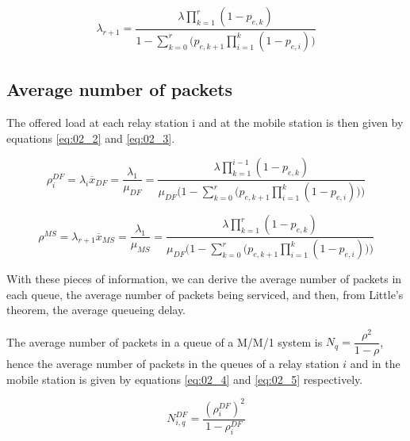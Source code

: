 \begin{align}
  \lambda_{r+1} = \dfrac{\lambda \prod\limits_{k=1}^{r} (1 - p_{e,k})}{1 - \sum\limits_{k=0}^r \Big(p_{e,k+1} \prod\limits_{i=1}^k (1 - p_{e,i})\Big)}
  \label{eq:02_lambda_r_plus_one}
\end{align}


\subsection{Average number of packets}

The offered load at each relay station i and at the mobile station is then given
by equations \ref{eq:02_2} and \ref{eq:02_3}.

\begin{equation}
  \rho_i^{DF} = \lambda_i \overline{x}_{DF} = \dfrac{\lambda_1}{\mu_{DF}} =
  \dfrac{\lambda \prod\limits_{k=1}^{i-1} (1 - p_{e,k})}{\mu_{DF}\Bigg(1 - \sum\limits_{k=0}^r \Big(p_{e,k+1} \prod\limits_{i=1}^k (1 - p_{e,i})\Big)\Bigg)}
  \label{eq:02_2}
\end{equation}

\begin{equation}
  \rho^{MS} = \lambda_{r+1} \overline{x}_{MS} = \dfrac{\lambda_1}{\mu_{MS}} =
  \dfrac{\lambda \prod\limits_{k=1}^{r} (1 - p_{e,k})}{\mu_{DF}\Bigg(1 - \sum\limits_{k=0}^r \Big(p_{e,k+1} \prod\limits_{i=1}^k (1 - p_{e,i})\Big)\Bigg)}
  \label{eq:02_3}
\end{equation}











With these pieces of information, we can derive the average number of packets
in each queue, the average number of packets being serviced, and then, from
Little's theorem, the average queueing delay.

The average number of packets in a queue of a M/M/1 system is
$N_q = \dfrac{\rho^2}{1-\rho}$, hence the average number of packets in the queues
of a relay station $i$ and in the mobile station is given by equations
\ref{eq:02_4} and \ref{eq:02_5} respectively.

\begin{equation}
  N_{i,q}^{DF} = \dfrac{(\rho_i^{DF})^2}{1 - \rho_i^{DF}}
  \label{eq:02_4}
\end{equation}

